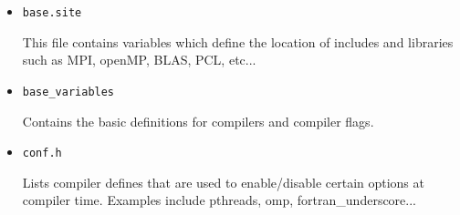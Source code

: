 \begin{itemize}

\item{{\tt base.site}}

This file contains variables which define the location of includes and
libraries such as MPI, openMP, BLAS, PCL, etc...

\item{{\tt base\_variables}}

Contains the basic definitions for compilers and compiler flags.

\item{{\tt conf.h}}

Lists compiler defines that are used to enable/disable certain options at
compiler time.  Examples include pthreads, omp, fortran\_underscore...

\end{itemize}
